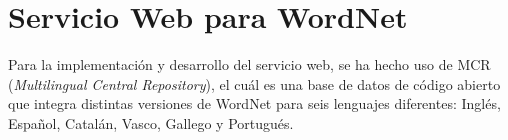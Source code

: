 \section{Servicio Web para WordNet}
\label{cap:sec:servicioWordnet}

Para la implementación y desarrollo del servicio web, se ha hecho uso de MCR (\textit{Multilingual Central Repository}), el cuál es una base de datos de código abierto que integra distintas versiones de WordNet para seis lenguajes diferentes: Inglés, Español, Catalán, Vasco, Gallego y Portugués. 